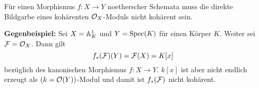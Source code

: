 \begin{bem}
\label{bem:9.11}
	Für einen Morphismus $f\colon X \to Y$ noetherscher Schemata muss die direkte Bildgarbe eines kohärenten $\mathcal{O}_X$-Moduls nicht kohärent sein.

	\textbf{Gegenbeispiel:} Sei $X=\mathbb {A}^1_K$ und $Y =\operatorname{Spec}(K)$ für einen Körper $K$. Weiter sei $\mathcal{F} = \mathcal{O}_X$. Dann gilt
	\[
		f_*(\mathcal{F})(Y) = \mathcal{F}(X) = K[x]
	\]
	bezüglich des kanonischen Morphismus $f\colon X \to Y$. $k[x]$ ist aber nicht endlich erzeugt als $(k=\mathcal{O}(Y))$-Modul und damit ist $f_*(\mathcal{F})$ nicht kohärent.
\end{bem}

